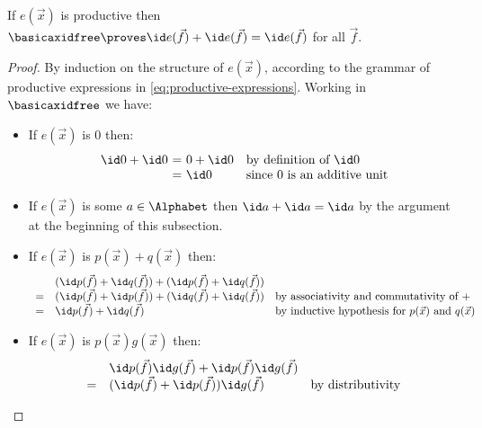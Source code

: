 \documentclass[runningheads]{amsart}
\begin{document}
\begin{lemma}
\label{idem-trans-is-idem-on-prod-exprs}
    If $e(\vec x)$ is productive then $\basicaxidfree \proves \id e(\vec f) + \id e(\vec f) = \id e(\vec f)$ for all $\vec f$.
\end{lemma}
\begin{proof}
    By induction on the structure of $e(\vec x)$, according to the grammar of productive expressions in \eqref{eq:productive-expressions}.
    Working in $\basicaxidfree$ we have:
    \begin{itemize}
        \item If $e(\vec x)$ is $0$ then: 
        \[
        \begin{array}{r@{\ = \ }ll}
             \id 0 + \id 0 & 0 + \id 0 & \text{by definition of $\id 0$} \\
                & \id 0 & \text{since $0$ is an additive unit}
        \end{array}
        \]
        \item If $e(\vec x)$ is some $a\in \Alphabet$ then $\id a + \id a = \id a$ by the argument at the beginning of this subsection.
        \item If $e(\vec x)$ is $p(\vec x) +  q(\vec x) $ then:
        \[
        \begin{array}{rll}
        & (\id p(\vec f) + \id q(\vec f)) + (\id p(\vec f) + \id q(\vec f)) & 
        \\
          =& (\id p(\vec f) + \id p(\vec f)) + (\id q(\vec f) + \id q(\vec f)) & \text{by associativity and commutativity of $+$} \\
            =& \id p(\vec f) + \id q(\vec f) & \text{by inductive hypothesis for $p(\vec x)$ and $q(\vec x)$} 
        \end{array}
        \]
        \item If $e(\vec x)$ is $p(\vec x)g(\vec x)$ then:
        \[
        \begin{array}{rll}
        &  \id p(\vec f)\id g(\vec f) + \id p(\vec f) \id g(\vec f) & 
        \\
          =  & (\id p(\vec f) + \id p(\vec f))\id g(\vec f) & \text{by distributivity} \\

\end{array}\]
\end{itemize}
\end{proof}
\end{document}
